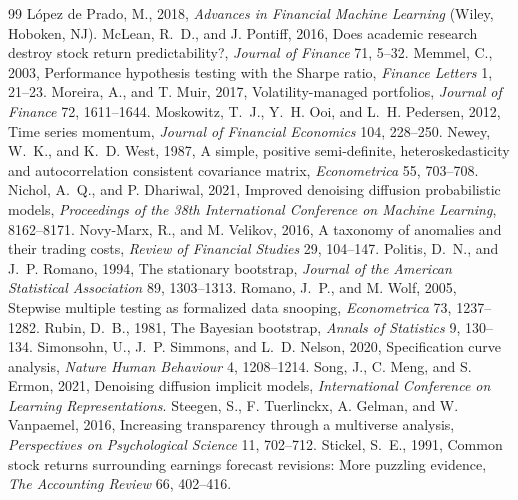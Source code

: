 \begin{thebibliography}{99}
 L\'opez de Prado, M., 2018, \emph{Advances in Financial Machine Learning} (Wiley, Hoboken, NJ).
 McLean, R.~D., and J. Pontiff, 2016, Does academic research destroy stock return predictability?, \emph{Journal of Finance} 71, 5--32.
 Memmel, C., 2003, Performance hypothesis testing with the Sharpe ratio, \emph{Finance Letters} 1, 21--23.
 Moreira, A., and T. Muir, 2017, Volatility-managed portfolios, \emph{Journal of Finance} 72, 1611--1644.
 Moskowitz, T.~J., Y.~H. Ooi, and L.~H. Pedersen, 2012, Time series momentum, \emph{Journal of Financial Economics} 104, 228--250.
 Newey, W.~K., and K.~D. West, 1987, A simple, positive semi-definite, heteroskedasticity and autocorrelation consistent covariance matrix, \emph{Econometrica} 55, 703--708.
 Nichol, A.~Q., and P. Dhariwal, 2021, Improved denoising diffusion probabilistic models, \emph{Proceedings of the 38th International Conference on Machine Learning}, 8162--8171.
 Novy-Marx, R., and M. Velikov, 2016, A taxonomy of anomalies and their trading costs, \emph{Review of Financial Studies} 29, 104--147.
 Politis, D.~N., and J.~P. Romano, 1994, The stationary bootstrap, \emph{Journal of the American Statistical Association} 89, 1303--1313.
 Romano, J.~P., and M. Wolf, 2005, Stepwise multiple testing as formalized data snooping, \emph{Econometrica} 73, 1237--1282.
 Rubin, D.~B., 1981, The Bayesian bootstrap, \emph{Annals of Statistics} 9, 130--134.
 Simonsohn, U., J.~P. Simmons, and L.~D. Nelson, 2020, Specification curve analysis, \emph{Nature Human Behaviour} 4, 1208--1214.
 Song, J., C. Meng, and S. Ermon, 2021, Denoising diffusion implicit models, \emph{International Conference on Learning Representations}.
 Steegen, S., F. Tuerlinckx, A. Gelman, and W. Vanpaemel, 2016, Increasing transparency through a multiverse analysis, \emph{Perspectives on Psychological Science} 11, 702--712.
 Stickel, S.~E., 1991, Common stock returns surrounding earnings forecast revisions: More puzzling evidence, \emph{The Accounting Review} 66, 402--416.

\end{thebibliography}
